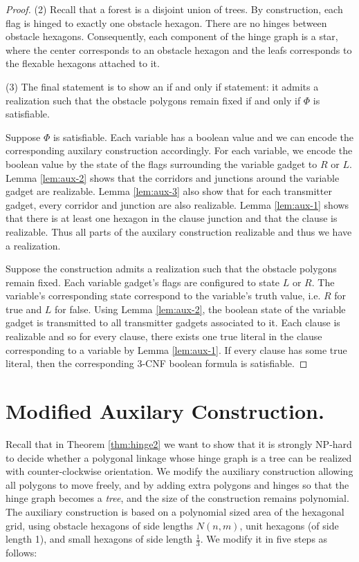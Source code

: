 \documentclass[10pt]{CSUNthesis}
\theoremstyle{plain}%
\theoremstyle{definition}
\theoremstyle{remark}
\begin{document}
\begin{proof}
\noindent (2) Recall that a forest is a disjoint union of trees. 
By construction, each flag is hinged to exactly one obstacle hexagon.  
There are no hinges between obstacle hexagons.
Consequently, each component of the hinge graph is a star, where the center corresponds to an obstacle hexagon and the leafs corresponds to the flexable hexagons attached to it.

\noindent (3) The final statement is to show an if and only if statement: it admits a realization such that the obstacle polygons remain fixed if and only if $\Phi$ is satisfiable.

Suppose $\Phi$ is satisfiable.  %
Each variable has a boolean value and we can encode the corresponding auxilary construction accordingly.  
For each variable, we encode the boolean value by the state of the flags surrounding the variable gadget to $R$ or $L$.  
Lemma \ref{lem:aux-2} shows that the corridors and junctions around the variable gadget are realizable.
Lemma \ref{lem:aux-3} also show that for each transmitter gadget, every corridor and junction are also realizable. 
Lemma \ref{lem:aux-1} shows that there is at least one hexagon in the clause junction and that the clause is realizable.
Thus all parts of the auxilary construction realizable and thus we have a realization.

Suppose the construction admits a realization such that the obstacle polygons remain fixed.
Each variable gadget's flags are configured to state $L$ or $R$. 
The variable's corresponding state correspond to the variable's truth value, i.e. $R$ for true and $L$ for false.
Using Lemma \ref{lem:aux-2}, the boolean state of the variable gadget is transmitted to all transmitter gadgets associated to it.
Each clause is realizable and so for every clause, there exists one true literal in the clause corresponding to a variable by Lemma \ref{lem:aux-1}. 
If every clause has some true literal, then the corresponding 3-CNF boolean formula is satisfiable.
\end{proof}
\section{Modified Auxilary Construction.}

Recall that in Theorem \ref{thm:hinge2} we want to show that it is strongly NP-hard to decide whether a polygonal linkage whose hinge graph is a tree can be realized with counter-clockwise orientation.
We modify the auxiliary construction allowing all polygons to move freely, and by adding extra polygons and hinges so that the hinge graph becomes a \emph{tree}, and the size of the construction remains polynomial. 
The auxiliary construction is based on a polynomial sized area of the hexagonal grid, using obstacle hexagons of side lengths $N(n,m)$, unit hexagons (of side length 1), and small hexagons of side length $\frac{1}{3}$. 
We modify it in five steps as follows:
\end{document}
